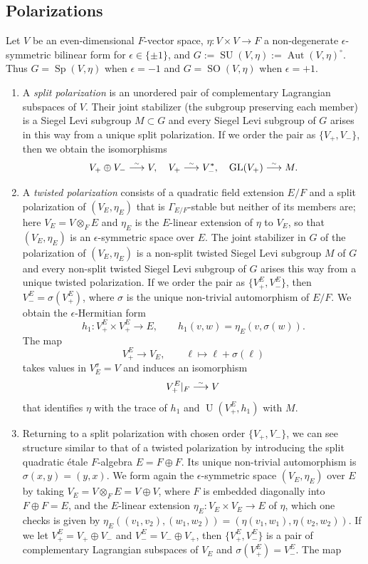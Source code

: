 \documentclass{article}
\def\simto{\buildrel\hbox{\tiny{$\sim$}}\over\longrightarrow}
\DeclareMathOperator{\Sp}{Sp}
\DeclareMathOperator{\GL}{GL}
\theoremstyle{definition}
\numberwithin{equation}{subsection}
\renewcommand{\-}{\hyp{}}
\DeclareMathOperator{\SO}{SO}
\DeclareMathOperator{\SU}{SU}
\DeclareMathOperator{\U}{U}
\DeclareMathOperator{\Aut}{Aut}
\begin{document}
\subsection{Polarizations} \label{sub:polar}

Let $V$ be an even-dimensional $F$-vector space, $\eta : V \times V \to F$ a non-degenerate $\epsilon$-symmetric bilinear form for $\epsilon \in \{\pm1\}$, and $G:=\SU(V,\eta):=\Aut(V,\eta)^\circ$.
Thus $G=\Sp(V,\eta)$ when $\epsilon=-1$ and $G=\SO(V,\eta)$ when $\epsilon=+1$.

\begin{enumerate}
	\item A \emph{split polarization} is an unordered pair of complementary Lagrangian subspaces of $V$. Their joint stabilizer (the subgroup preserving each member) is a Siegel Levi subgroup $M \subset G$ and every Siegel Levi subgroup of $G$ arises in this way from a unique split polarization. If we order the pair as $\{V_+,V_-\}$, then we obtain the isomorphisms
	\[ V_+ \oplus V_- \simto V,\quad V_+ \simto V_-^*,\quad \GL(V_+) \simto M. \]
	\item A \emph{twisted polarization} consists of a quadratic field extension $E/F$ and a split polarization of $(V_E,\eta_E)$ that is $\Gamma_{E/F}$-stable but neither of its members are; here $V_E=V\otimes_F E$ and $\eta_E$ is the $E$-linear extension of $\eta$ to $V_E$, so that $(V_E,\eta_E)$ is an $\epsilon$-symmetric space over $E$. The joint stabilizer in $G$ of the polarization of $(V_E,\eta_E)$ 
is a non-split twisted Siegel Levi subgroup $M$ of $G$ and every non-split twisted Siegel Levi subgroup of $G$ arises this way from a unique twisted polarization. If we order the pair as $\{V_+^E,V_-^E\}$, then $V_-^E=\sigma(V_+^E)$, where $\sigma$ is the unique non-trivial automorphism of $E/F$. We obtain the $\epsilon$-Hermitian form
	\[ h_1 : V_+^E \times V_+^E \to E,\qquad h_1(v,w)=\eta_E(v,\sigma(w)).  \]
	The map
	\[ V_+^E \to V_E,\qquad \ell \mapsto \ell+\sigma(\ell) \]
	takes values in $V_E^\sigma=V$ and induces an isomorphism
	\[ V_+^E|_F \simto V \]
	that identifies $\eta$ with the trace of $h_1$ and $\U(V_+^E,h_1)$ with $M$.
	\item Returning to a split polarization with chosen order $\{V_+,V_-\}$, we can see structure similar to that of a twisted polarization by introducing the split quadratic \'etale $F$-algebra $E=F \oplus F$. Its unique non-trivial automorphism is $\sigma(x,y)=(y,x)$. We form again the $\epsilon$-symmetric space $(V_E,\eta_E)$ over $E$ by taking $V_E = V\otimes_F E=V \oplus V$, where $F$ is embedded diagonally into $F \oplus F = E$, and the $E$-linear extension $\eta_E : V_E \times V_E \to E$ of $\eta$, which one checks is given by $\eta_E((v_1,v_2),(w_1,w_2))=(\eta(v_1,w_1),\eta(v_2,w_2))$. If we let $V_+^E=V_+ \oplus V_-$ and $V_-^E=V_- \oplus V_+$, then $\{V_+^E,V_-^E\}$ is a pair of complementary Lagrangian subspaces of $V_E$ and $\sigma(V_+^E)=V_-^E$. The map

\end{enumerate}
\end{document}
